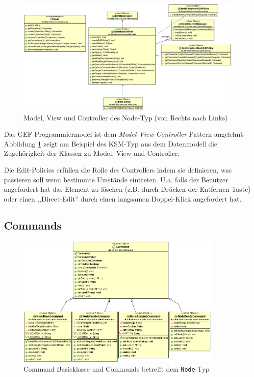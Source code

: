 \documentclass[%
12pt,titlepage,abstracton,DIV=10,BCOR=0.5cm]{scrreprt}
\begin{document}
\begin{figure}[ht]
\centering
\includegraphics[width=\textwidth]{images/node-edit-and-figure.PNG}
\caption{Model, View und Controller des Node-Typ (von Rechts nach Links)}
\label{fig:node-edit-and-figure}
\end{figure}

Das GEF Programmiermodel ist dem \textit{Model-View-Controller} Pattern
angelehnt. Abbildung \ref{fig:node-edit-and-figure} zeigt am Beispiel des KSM-Typ aus dem Datenmodell
die Zugehörigkeit der Klassen zu Model, View und Controller.

Die Edit-Policies erfüllen die Rolle des Controllers indem sie definieren, was
passieren soll wenn bestimmte Umstände eintreten. U.a. falls der Benutzer
angefordert hat das Element zu löschen (z.B. durch Drücken der Entfernen Taste)
oder einen ,,Direct-Edit'' durch einen langsamen Doppel-Klick angefordert hat.

\subsection{Commands}

\begin{figure}[ht]
\centering
\includegraphics[width=0.9\textwidth]{images/commands.PNG}
\caption{Command Basisklasse und Commands betrefft dem \texttt{Node}-Typ}
\label{fig:commands}
\end{figure}
\end{document}
